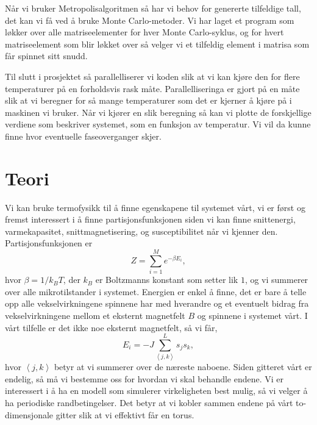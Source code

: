 \documentclass[norsk, 10pt]{article}
\def\mean#1{\left\langle #1 \right\rangle}
\begin{document}
Når vi bruker Metropolisalgoritmen så har vi behov for genererte tilfeldige tall, det kan vi få ved å bruke Monte Carlo-metoder. Vi har laget et program som løkker over alle matriseelementer for hver Monte Carlo-syklus, og for hvert matriseelement som blir løkket over så velger vi et tilfeldig element i matrisa som får spinnet sitt snudd. 

Til slutt i prosjektet så parallelliserer vi koden slik at vi kan kjøre den for flere temperaturer på en forholdsvis rask måte. Parallelliseringa er gjort på en måte slik at vi beregner for så mange temperaturer som det er kjerner å kjøre på i maskinen vi bruker. Når vi kjører en slik beregning så kan vi plotte de forskjellige verdiene som beskriver systemet, som en funksjon av temperatur. Vi vil da kunne finne hvor eventuelle faseoverganger skjer.

\section*{Teori}
Vi kan bruke termofysikk til å finne egenskapene til systemet vårt, vi er først og fremst interessert i å finne partisjonsfunksjonen siden vi kan finne snittenergi, varmekapasitet, snittmagnetisering, og susceptibilitet når vi kjenner den. Partisjonsfunksjonen er
$$ Z = \sum\limits_{i=1}^{M} e^{-\beta E_i}, $$
hvor $\beta = 1/k_B T$, der $k_B$ er Boltzmanns konstant som setter lik $1$, og vi summerer over alle mikrotilstander i systemet. Energien er enkel å finne, det er bare å telle opp alle vekselvirkningene spinnene har med hverandre og et eventuelt bidrag fra vekselvirkningene mellom et eksternt magnetfelt $B$ og spinnene i systemet vårt. I vårt tilfelle er det ikke noe eksternt magnetfelt, så vi får,
$$ E_i = -J\sum\limits_{\mean{j,k}}^{L} s_js_k, $$
hvor $\mean{j,k}$ betyr at vi summerer over de næreste naboene. Siden gitteret vårt er endelig, så må vi bestemme oss for hvordan vi skal behandle endene. Vi er interessert i å ha en modell som simulerer virkeligheten best mulig, så vi velger å ha periodiske randbetingelser. Det betyr at vi kobler sammen endene på vårt to-dimensjonale gitter slik at vi effektivt får en torus.
\end{document}

